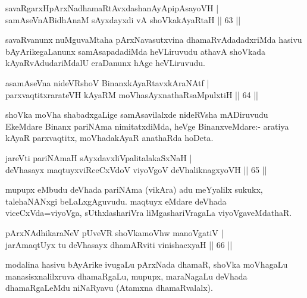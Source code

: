 
\begin{shl}
savaRgarxHpArxNadhamaRtAvxdashanAyApipAsayoVH |\\
samAseVnABidhAnaM sAyxdayxdi vA shoVkakAyaRtaH \hfill || 63 ||
\end{shl}

\begin{artha}
savaRvanunx nuMguvaMtaha pArxNavasutxvina dhamaRvAdadadxriMda hasivu bAyArikegaLanunx samAsapadadiMda heVLiruvudu athavA shoVkada kAyaRvAdudariMdalU eraDanunx hAge heVLiruvudu.
\end{artha}

\begin{shl}
asamAseVna nideVRshoV BinanxkAyaRtavxkAraNAtf |\\
parxvaqtitxrarateVH kAyaRM moVhasAyxnathaRsaMpulxtiH \hfill || 64 ||
\end{shl}

\begin{artha}
shoVka moVha shabadxgaLige samAsavilalxde nideRVsha mADiruvudu EkeMdare Binanx pariNAma nimitatxdiMda, heVge BinanxveMdare:- aratiya kAyaR parxvaqtitx, moVhadakAyaR anathaRda hoDeta.
\end{artha}

\begin{shl}
jareVti pariNAmaH sAyxdavxliVpalitalakaSxNaH |\\
deVhasayx maqtuyxviRceCxVdoV viyoVgoV deVhaliknagxyoVH \hfill || 65 ||
\end{shl}

\begin{artha}
mupupx eMbudu deVhada pariNAma (vikAra) adu meYyalilx sukukx, talehaNANxgi beLaLxgAguvudu. maqtuyx eMdare deVhada viceCxVda=\break viyoVga, sUthxlashariVra liMgashariVragaLa viyoVgaveMdathaR.
\end{artha}


\begin{shl}
pArxNAdhikaraNeV pUveVR shoVkamoVhw manoVgatiV  |\\
jarAmaqtUyx tu deVhasayx dhamARviti vinishacxyaH \hfill || 66 ||
\end{shl}

\begin{artha}
modalina hasivu bAyArike ivugaLu pArxNada dhamaR, shoVka moVhagaLu manasisxnalilxruva dhamaRgaLu, mupupx, maraNagaLu deVhada dhamaRgaLeMdu niNaRyavu (Atamxna dhamaRvalalx).
\end{artha}

